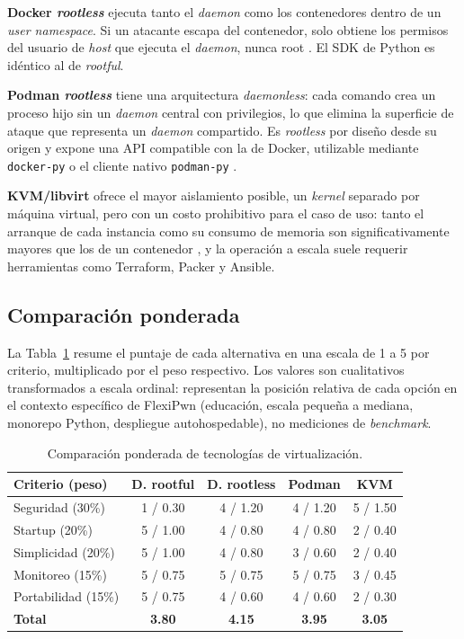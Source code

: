 \textbf{Docker \textit{rootless}} ejecuta tanto el \textit{daemon} como los
contenedores dentro de un \textit{user namespace}. Si un atacante escapa del
contenedor, solo obtiene los permisos del usuario de \textit{host} que ejecuta
el \textit{daemon}, nunca root \cite{docker-rootless}. El SDK de Python es
idéntico al de \textit{rootful}.

\textbf{Podman \textit{rootless}} tiene una arquitectura \textit{daemonless}:
cada comando crea un proceso hijo sin un \textit{daemon} central con
privilegios, lo que elimina la superficie de ataque que representa un
\textit{daemon} compartido. Es \textit{rootless} por diseño desde su origen y
expone una API compatible con la de Docker, utilizable mediante
\texttt{docker-py} o el cliente nativo \texttt{podman-py} \cite{podman-py,
podman-vs-docker}.

\textbf{KVM/libvirt} ofrece el mayor aislamiento posible, un \textit{kernel}
separado por máquina virtual, pero con un costo prohibitivo para el caso de uso:
tanto el
arranque de cada instancia como su consumo de memoria son significativamente
mayores que los de un contenedor \cite{felter-vm-containers}, y la operación a
escala suele requerir herramientas como Terraform, Packer y Ansible.

\subsection{Comparación ponderada}

La Tabla~\ref{tab:virt-scoring} resume el puntaje de cada alternativa en una
escala de 1 a 5 por criterio, multiplicado por el peso respectivo. Los valores
son cualitativos transformados a escala ordinal: representan la posición
relativa de cada opción en el contexto específico de FlexiPwn (educación, escala
pequeña a mediana, monorepo Python, despliegue autohospedable), no mediciones de
\textit{benchmark}.

\begin{table}[h]
\centering
\caption{Comparación ponderada de tecnologías de virtualización.}
\label{tab:virt-scoring}
\begin{tabular}{|l|c|c|c|c|}
\hline
\textbf{Criterio (peso)} & \textbf{D. rootful} & \textbf{D. rootless} &
\textbf{Podman} & \textbf{KVM} \\
\hline
Seguridad (30\%)       & 1 / 0.30 & 4 / 1.20 & 4 / 1.20 & 5 / 1.50 \\
Startup (20\%)         & 5 / 1.00 & 4 / 0.80 & 4 / 0.80 & 2 / 0.40 \\
Simplicidad (20\%)     & 5 / 1.00 & 4 / 0.80 & 3 / 0.60 & 2 / 0.40 \\
Monitoreo (15\%)       & 5 / 0.75 & 5 / 0.75 & 5 / 0.75 & 3 / 0.45 \\
Portabilidad (15\%)    & 5 / 0.75 & 4 / 0.60 & 4 / 0.60 & 2 / 0.30 \\
\hline
\textbf{Total}         & \textbf{3.80} & \textbf{4.15} & \textbf{3.95} & \textbf{3.05} \\
\hline
\end{tabular}
\end{table}

